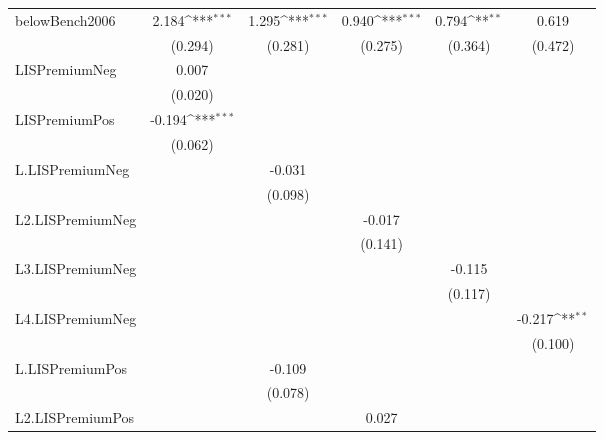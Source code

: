 {
\def\sym#1{\ifmmode^{#1}\else\(^{#1}\)\fi}
\begin{tabular}{l*{5}{c}}
\toprule
\midrule
belowBench2006&    2.184\sym{***}&    1.295\sym{***}&    0.940\sym{***}&    0.794\sym{**} &    0.619         \\
          &  (0.294)         &  (0.281)         &  (0.275)         &  (0.364)         &  (0.472)         \\
LISPremiumNeg&    0.007         &                  &                  &                  &                  \\
          &  (0.020)         &                  &                  &                  &                  \\
LISPremiumPos&   -0.194\sym{***}&                  &                  &                  &                  \\
          &  (0.062)         &                  &                  &                  &                  \\
L.LISPremiumNeg&                  &   -0.031         &                  &                  &                  \\
          &                  &  (0.098)         &                  &                  &                  \\
L2.LISPremiumNeg&                  &                  &   -0.017         &                  &                  \\
          &                  &                  &  (0.141)         &                  &                  \\
L3.LISPremiumNeg&                  &                  &                  &   -0.115         &                  \\
          &                  &                  &                  &  (0.117)         &                  \\
L4.LISPremiumNeg&                  &                  &                  &                  &   -0.217\sym{**} \\
          &                  &                  &                  &                  &  (0.100)         \\
L.LISPremiumPos&                  &   -0.109         &                  &                  &                  \\
          &                  &  (0.078)         &                  &                  &                  \\
L2.LISPremiumPos&                  &                  &    0.027         &                  &                  \\

\end{tabular}}
